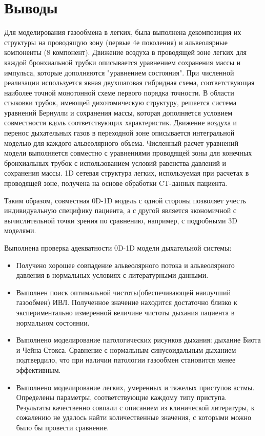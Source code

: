 \chapter*{Выводы}						%


Для моделирования газообмена в легких, была выполнена декомпозиция их структуры на проводящую зону (первые 4е поколения) и альвеолярные компоненты (8 компонент). Движение воздуха в проводящей зоне легких для каждой бронхиальной трубки описывается уравнением сохранения массы и импульса, которые дополняются "уравнением состояния". При численной реализации используется явная двухшаговая гибридная схема, соответствующая наиболее точной монотонной схеме первого порядка точности. В области стыковки трубок, имеющей дихотомическую структуру, решается система уравнений Бернулли и сохранения массы, которая дополняется условием совместности вдоль соответствующих характеристик. Движение воздуха и перенос дыхательных газов в переходной зоне описывается интегральной моделью для каждого альвеолярного объема. Численный расчет уравнений модели выполняется совместно с уравнениями проводящей зоны для конечных бронхиальных трубок с использованием условий равенства давлений и сохранения массы. 1D сетевая структура легких, используемая при расчетах в проводящей зоне, получена на основе обработки CT-данных пациента. 

Таким образом, совместная 0D-1D модель с одной стороны позволяет учесть индивидуальную специфику пациента, а с другой является экономичной с вычислительной точки зрения по сравнению, например, с подробными 3D моделями.     

Выполнена проверка адекватности 0D-1D модели дыхательной системы: 
\begin{itemize}
    \item 
    Получено хорошее совпадение альвеолярного потока и альвеолярного давления в нормальных условиях с литературными данными. 
    \item 
    Выполнен поиск оптимальной чистоты(обеспечивающей наилучший газообмен) ИВЛ. Полученное значение находится достаточно близко к экспериментально измеренной величине чистоты дыхания пациента в нормальном состоянии.
    \item
    Выполнено моделирование патологических рисунков дыхания: дыхание Биота и Чейна-Стокса. Сравнение с нормальным синусоидальным дыханием подтвердило, что при наличии патологии газообмен становится менее эффективным.
    \item
    Выполнено моделирование легких, умеренных и тяжелых приступов астмы. Определены параметры, соответствующие каждому типу приступа. Результаты качественно совпали с описанием из клинической литературы, к сожалению не удалось найти количественные значения, с которыми можно было бы провести сравнение.
\end{itemize}
 
